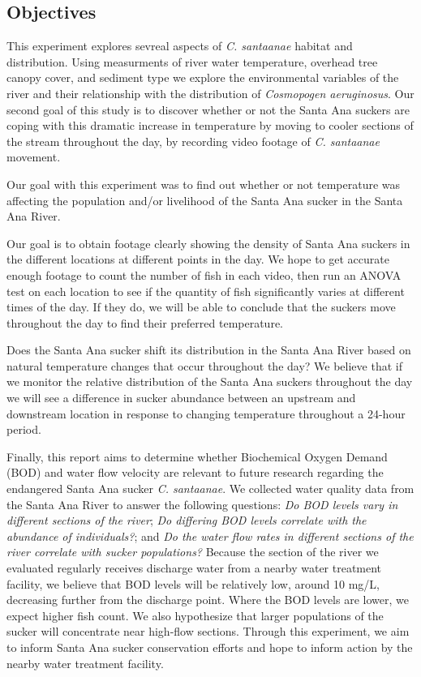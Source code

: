 \documentclass{article}\usepackage[]{graphicx}\usepackage[]{color}
\begin{document}
\subsection{Objectives}
This experiment explores sevreal aspects of \emph{C. santaanae} habitat and distribution. Using measurments of river water temperature, overhead tree canopy cover, and sediment type we explore the environmental variables of the river and their relationship with the distribution of \emph{Cosmopogen aeruginosus}. Our second goal of this study is to discover whether or not the Santa Ana suckers are coping with this dramatic increase in temperature by moving to cooler sections of the stream throughout the day, by recording video footage of \emph{C. santaanae} movement. 

Our goal with this experiment was to find out whether or not temperature was affecting the population and/or livelihood of the Santa Ana sucker in the Santa Ana River.

Our goal is to obtain footage clearly showing the density of Santa Ana suckers in the different locations at different points in the day.  We hope to get accurate enough footage to count the number of fish in each video, then run an ANOVA test on each location to see if the quantity of fish significantly varies at different times of the day.  If they do, we will be able to conclude that the suckers move throughout the day to find their preferred temperature.

Does the Santa Ana sucker shift its distribution in the Santa Ana River based on natural temperature changes that occur throughout the day? We believe that if we monitor the relative distribution of the Santa Ana suckers throughout the day we will see a difference in sucker abundance between an upstream and downstream location in response to changing temperature throughout a 24-hour period.

Finally, this report aims to determine whether Biochemical Oxygen Demand (BOD) and water flow velocity are relevant to future research regarding the endangered Santa Ana sucker \emph{C. santaanae}. We collected water quality data from the Santa Ana River to answer the following questions: \emph{Do BOD levels vary in different sections of the river}; \emph{Do differing BOD levels correlate with the abundance of individuals?}; and \emph{Do the water flow rates in different sections of the river correlate with sucker populations?} Because the section of the river we evaluated regularly receives discharge water from a nearby water treatment facility, we believe that BOD levels will be relatively low, around 10 mg/L, decreasing further from the discharge point. Where the BOD levels are lower, we expect higher fish count. We also hypothesize that larger populations of the sucker will concentrate near high-flow sections. Through this experiment, we aim to inform Santa Ana sucker conservation efforts and hope to inform action by the nearby water treatment facility. 
\end{document}
